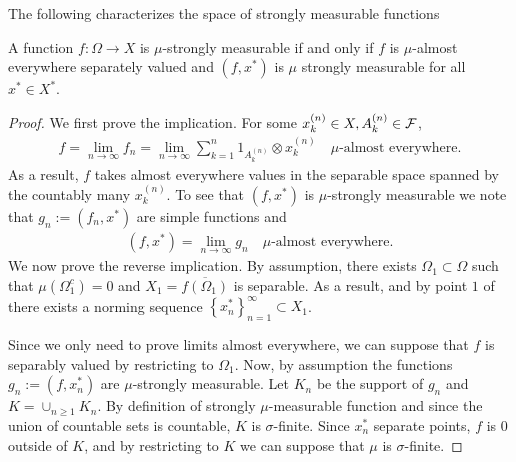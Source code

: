 \documentclass[
    a4paper,
    DIV=14,
    abstract=true,
    numbers=noenddot
]{scrartcl}
\begin{document}
The following characterizes the space of strongly measurable functions
\begin{theorem}\label{thm:pettis}
	A function $f:\Omega\to X$ is $\mu$-strongly measurable if and only if $f$ is $\mu $-almost everywhere separately valued and $(f, x^*)$ is $\mu $ strongly measurable for all $x^*\in X^*$.
\end{theorem}
\begin{proof}
	We first prove the implication. For some $x_k^{(n)} \in X , A_k^{(n)} \in \mathcal{F} $,
	\begin{align*}
		f= \lim_{n \to \infty} f_n=\lim_{n \to \infty} \sum_{k=1}^n 1_{A_k^{(n)}}\otimes x^{(n)}_{k} \quad \mu\text{-almost everywhere}.
	\end{align*}
	As a result, $f$ takes almost everywhere values in the separable space spanned by the countably many $x_k^{(n)}$. To see that $(f,x^*)$ is $\mu $-strongly measurable we note that $g_n :=(f_n,x^*)$ are simple functions and
	\begin{align*}
		(f,x^*)= \lim_{n \to \infty} g_n \quad \mu\text{-almost everywhere}.
	\end{align*}
	We now prove the reverse implication. By assumption, there exists $\Omega _1 \subset \Omega $ such that $\mu (\Omega _1^c)=0 $ and $X_1=\overline{f(\Omega_1 )}$ is separable. As a result, and by point $1$ of  there exists a norming sequence $\left\{x_n^*\right\}_{n=1}^\infty \subset X_1$.

	Since we only need to prove limits almost everywhere, we can suppose that $f$ is separably valued by restricting to $\Omega _1$. Now, by assumption the functions $g_n:=(f,x_n^*)$ are $\mu$-strongly measurable. Let $K_n$ be the support of $g_n$ and $K=\cup_{n \geq 1}K_n$. By definition of strongly $\mu $-measurable function and since the union of countable sets is countable, $K$ is $\sigma $-finite. Since $x_n^*$ separate points, $f$ is $0$ outside of $K$, and by restricting to $K$ we can suppose that $\mu $ is $\sigma $-finite.


\end{proof}
\end{document}
